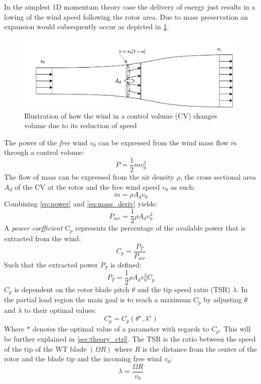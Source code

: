 In the simplest 1D momentum theory case the delivery of energy just results in a lowing of the wind speed following the rotor area. Due to mass preservation an expansion would subsequently occur as depicted in \cref{fig:betz}.
\begin{figure}[ht]
	\centering
	\includegraphics[width=0.8\linewidth]{Graphics/FlowThroughRotor.pdf}
	\caption{Illustration of how the wind in a control volume (CV) changes volume due to its reduction of speed}
	\label{fig:betz}
\end{figure}
The power of the \textit{free} wind $ v_0 $ can be expressed from the wind mass flow $ \dot{m} $ through a control volume:
\begin{equation} \label{eq:power}
	P = \dfrac{1}{2} \dot{m} v_0^2
\end{equation}
The flow of mass can be expressed from the air density $ \rho $, the cross sectional area $ A_d $ of the CV  at the rotor and the free wind speed $ v_0 $ as such:
\begin{equation}\label{eq:mass_deriv}
	\dot{m} = \rho A_d v_0
\end{equation}
Combining \cref{eq:power} and \cref{eq:mass_deriv} yields:
\begin{equation}\label{eq:power2}
	P_{air} = \dfrac{1}{2} \rho A_d v_0^3
\end{equation}
A \textit{power coefficient} $ C_p $ represents the percentage of the available power that is extracted from the wind:
\begin{equation}\label{eq:Cp}
	C_p = \dfrac{P_T}{P_{air}}
\end{equation}
Such that the extracted power $ P_T $ is defined:
\begin{equation}\label{eq:power_w_Cp}
	P_{T} = \dfrac{1}{2} \rho A_d v_0^3 C_p
\end{equation}
$ C_p $ is dependent on the rotor blade pitch $ \theta $ and the tip speed ratio (TSR) $ \lambda $. In the partial load region the main goal is to reach a maximum $ C_p $ by adjusting $ \theta $ and  $ \lambda $ to their optimal values:
\begin{equation}\label{eq:cp_optimal}
	C_p^\star = C_p(\theta^\star, \lambda^\star)
\end{equation}
Where $ * $ denotes the optimal value of a parameter with regards to $ C_p $. This will be further explained in \cref{sec:theory_ctrl}. The TSR is the ratio between the speed of the tip of the WT blade $ (\Omega R) $ where $ R $ is the distance from the center of the rotor and the blade tip and the incoming free wind $v_0$:
\begin{equation}\label{eq:tipspeedratio}
	\lambda = \dfrac{\Omega R}{v_0}
\end{equation}

